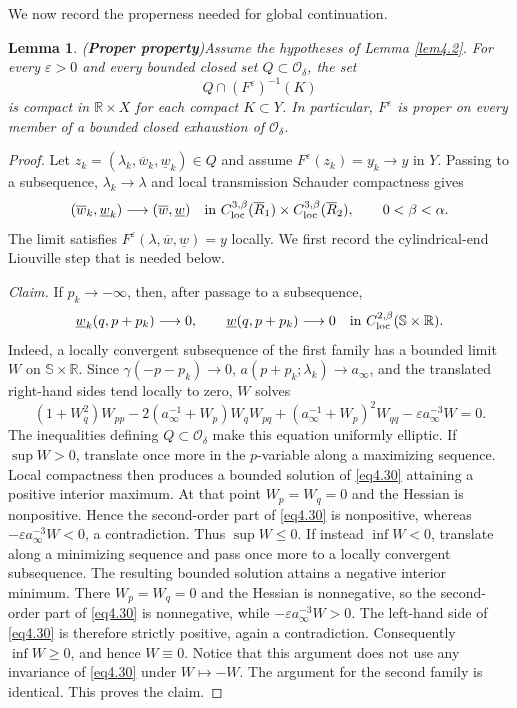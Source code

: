 \documentclass[11pt,reqno]{amsart}
\numberwithin{equation}{section}
\newtheorem{lemma}[theorem]{Lemma}
\theoremstyle{definition}
\theoremstyle{remark}
\begin{document}
We now record the properness needed for global continuation.
\begin{lemma}({\bf Proper property})\label{lem4.5}
Assume the hypotheses of Lemma \ref{lem4.2}.  For every
$\varepsilon>0$ and every bounded closed set
$Q\subset\mathcal O_\delta$, the set
\[
 Q\cap(F^\varepsilon)^{-1}(K)
\]
is compact in $\mathbb R\times X$ for each compact $K\subset Y$.
In particular, $F^\varepsilon$ is proper on every member of a bounded
closed exhaustion of $\mathcal O_\delta$.
\end{lemma}
\begin{proof}
Let
$z_k=(\lambda_k,\overline w_k,\underline w_k)\in Q$ and assume
$F^\varepsilon(z_k)=y_k\to y$ in $Y$.  Passing to a subsequence,
$\lambda_k\to\lambda$ and local transmission Schauder compactness
gives
\[
 (\overline w_k,\underline w_k)
 \longrightarrow(\overline w,\underline w)
 \quad\text{in }C^{3,\beta}_{\rm loc}(\overline R_1)
 \times C^{3,\beta}_{\rm loc}(\overline R_2),
 \qquad 0<\beta<\alpha.
\]
The limit satisfies
$F^\varepsilon(\lambda,\overline w,\underline w)=y$ locally.  We
first record the cylindrical-end Liouville step that is needed below.

\smallskip
\noindent\emph{Claim.}
If $p_k\to-\infty$, then, after passage to a subsequence,
\begin{equation}\label{eq:shifted-background-zero}
 \underline w_k(q,p+p_k)\longrightarrow0,
 \qquad
 \underline w(q,p+p_k)\longrightarrow0
 \quad\text{in }C^{2,\beta}_{\rm loc}(\mathbb S\times\mathbb R).
\end{equation}
Indeed, a locally convergent subsequence of the first family has a
bounded limit $W$ on $\mathbb S\times\mathbb R$.  Since
$\gamma(-p-p_k)\to0$, $a(p+p_k;\lambda_k)\to a_\infty$, and the
translated right-hand sides tend locally to zero, $W$ solves
\begin{equation}\label{eq4.30}
 (1+W_q^2)W_{pp}
 -2(a_\infty^{-1}+W_p)W_qW_{pq}
 +(a_\infty^{-1}+W_p)^2W_{qq}
 -\varepsilon a_\infty^{-3}W=0.
\end{equation}
The inequalities defining $Q\subset\mathcal O_\delta$ make this
equation uniformly elliptic.  If $\sup W>0$, translate once more in
the $p$-variable along a maximizing sequence.  Local compactness
then produces a bounded solution of \eqref{eq4.30} attaining a
positive interior maximum.  At that point $W_p=W_q=0$ and the
Hessian is nonpositive.  Hence the second-order part of
\eqref{eq4.30} is nonpositive, whereas
$-\varepsilon a_\infty^{-3}W<0$, a contradiction.  Thus
$\sup W\leq0$.  If instead $\inf W<0$, translate along a minimizing
sequence and pass once more to a locally convergent subsequence.
The resulting bounded solution attains a negative interior minimum.
There $W_p=W_q=0$ and the Hessian is nonnegative, so the second-order
part of \eqref{eq4.30} is nonnegative, while
$-\varepsilon a_\infty^{-3}W>0$.  The left-hand side of
\eqref{eq4.30} is therefore strictly positive, again a contradiction.
Consequently $\inf W\geq0$, and hence $W\equiv0$.  Notice that this
argument does not use any invariance of \eqref{eq4.30} under
$W\mapsto-W$.  The argument for the second family is identical.
This proves the claim.


\end{proof}
\end{document}
